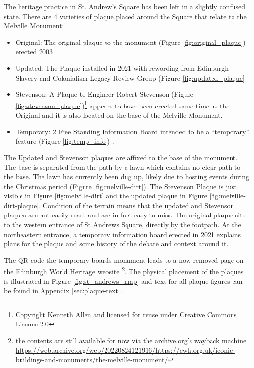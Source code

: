 \documentclass{scrartcl}
\renewcommand{\cite}{\parencite}
\begin{document}
The heritage practice in St. Andrew's Square has been left in a slightly confused state.
There are 4 varieties of plaque placed around the Square that relate to the Melville Monument:

\begin{itemize}
    \item Original: The original plaque to the monument (Figure \ref{fig:original_plaque}) erected 2003 \cite{godard_2018}
    \item Updated: The Plaque installed in 2021 with rewording from Edinburgh Slavery and Colonialism Legacy Review Group (Figure \ref{fig:updated_plaque}
    \item Stevenson: A Plaque to Engineer Robert Stevenson (Figure \ref{fig:stevenson_plaque})\footnote{Copyright Kenneth Allen and licensed for reuse under Creative Commons Licence 2.0} appears to have been erected same time as the Original and it is also located on the base of the Melville Monument.
    \item Temporary: 2 Free Standing Information Board intended to be a ``temporary'' \cite{council_2020} feature (Figure \ref{fig:temp_info}) . 
\end{itemize}

The Updated and Stevenson plaques are affixed to the base of the monument. The base is separated from the path by a lawn which contains no clear path to the base. The lawn has currently been dug up, likely due to hosting events during the Christmas period (Figure \ref{fig:melville-dirt}). The Stevenson Plaque is just visible in Figure \ref{fig:melville-dirt} and the updated plaque in Figure \ref{fig:melville-dirt-plaque}. Condition of the terrain means that the updated and Stevenson plaques are not easily read, and are in fact easy to miss. The original plaque sits to the western entrance of St Andrews Square, directly by the footpath. At the northeastern entrance, a temporary information board erected in 2021 explains plans for the plaque and some history of the debate and context around it.

The QR code the temporary boards monument leads to a now removed page on the Edinburgh World Heritage website \footnote{the contents are still available for now via the archive.org's wayback machine \url{https://web.archive.org/web/20220824121916/https://ewh.org.uk/iconic-buildings-and-monuments/the-melville-monument/}}. The physical placement of the plaques is illustrated in Figure \ref{fig:st_andrews_map} and text for all plaque figures can be found in Appendix \ref{sec:plaque-text}.
\end{document}
